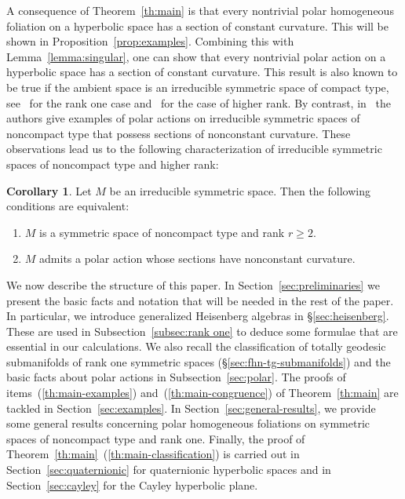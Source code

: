 \documentclass[12pt, a4paper]{amsart}
\theoremstyle{definition}
\newtheorem{maincorollary}[maintheorem]{Corollary}
\begin{document}
A consequence of Theorem~\ref{th:main} is that every nontrivial polar homogeneous
foliation on a hyperbolic space has a section of constant curvature.
This will be shown in Proposition~\ref{prop:examples}.
Combining this with Lemma~\ref{lemma:singular}, one can show that every nontrivial
polar action on a hyperbolic space has a section of constant curvature.
This result is also known to be true if the ambient space is an irreducible
symmetric space of compact type,
see~\cite[Proposition~1B.1]{PodestaThorbergsson99} for the rank one case
and~\cite[Theorem~1.1]{KollrossLytchak13} for the case of higher rank.
By contrast, in~\cite[Proposition~4.2]{BerndtDiazTamaru10} the authors give examples
of polar actions on irreducible symmetric spaces of noncompact type
that possess sections of nonconstant curvature.
These observations lead us to the following characterization of irreducible
symmetric spaces of noncompact type and higher rank:

\begin{maincorollary}\label{cor:rank-one-characterization}
    Let $M$ be an irreducible symmetric space.
    Then the following conditions are equivalent:
    \begin{enumerate}[\rm (i)]
        \item
            $M$ is a symmetric space of noncompact type and rank $r\geq 2$.

        \item
            $M$ admits a polar action whose sections have nonconstant curvature.
    \end{enumerate}
\end{maincorollary}

We now describe the structure of this paper.
In Section~\ref{sec:preliminaries} we present the basic facts and notation that will be needed in the rest of the paper.
In particular, we introduce generalized Heisenberg algebras in \S\ref{sec:heisenberg}.
These are used in Subsection~\ref{subsec:rank one} to deduce some formulae that are essential in our calculations.
We also recall the classification of totally geodesic submanifolds of rank one symmetric spaces (\S\ref{sec:fhn-tg-submanifolds}) and the basic facts about polar actions in Subsection~\ref{sec:polar}.
The proofs of items~(\ref{th:main-examples}) and~(\ref{th:main-congruence}) 
of Theorem~\ref{th:main} are tackled in Section~\ref{sec:examples}. 
In Section~\ref{sec:general-results}, we provide some general results concerning polar
homogeneous foliations on symmetric spaces of noncompact type and rank one.
Finally, the proof of Theorem~\ref{th:main}~(\ref{th:main-classification}) is carried out in 
Section~\ref{sec:quaternionic} for quaternionic hyperbolic spaces 
and in Section~\ref{sec:cayley} for the Cayley hyperbolic plane.
\end{document}
